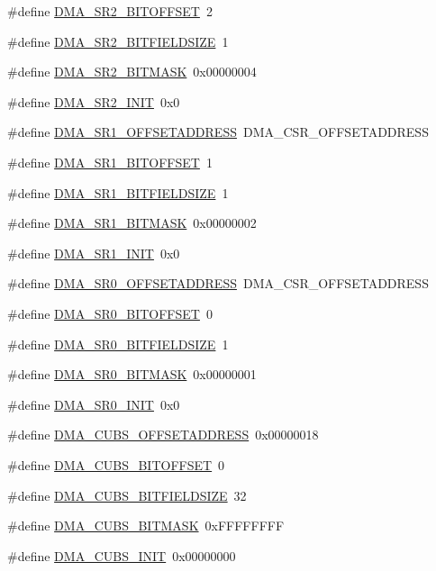 \begin{DoxyCompactItemize}
\#define \hyperlink{a00547_a04709a58304f2d8e896081ed6cf6815c}{DMA\_\-SR2\_\-BITOFFSET}~2
\item 
\#define \hyperlink{a00547_ad366e18f388c97c7fa1c05106ed5b94f}{DMA\_\-SR2\_\-BITFIELDSIZE}~1
\item 
\#define \hyperlink{a00547_aaf7ab40ea8ae2ad0865247654987b347}{DMA\_\-SR2\_\-BITMASK}~0x00000004
\item 
\#define \hyperlink{a00547_a813c497e81e26f04cb817525f4e76832}{DMA\_\-SR2\_\-INIT}~0x0
\item 
\#define \hyperlink{a00547_ada0e235423bd4db7ed48117ea4e5351a}{DMA\_\-SR1\_\-OFFSETADDRESS}~DMA\_\-CSR\_\-OFFSETADDRESS
\item 
\#define \hyperlink{a00547_a006e4b58517a5dceeb10c5c8dcb43443}{DMA\_\-SR1\_\-BITOFFSET}~1
\item 
\#define \hyperlink{a00547_aa887312016f95805db5303802fc00992}{DMA\_\-SR1\_\-BITFIELDSIZE}~1
\item 
\#define \hyperlink{a00547_a4fdaa0cb47057b0f86f4557acb74d498}{DMA\_\-SR1\_\-BITMASK}~0x00000002
\item 
\#define \hyperlink{a00547_a31b34fd5f312ae07fac98416c94975cb}{DMA\_\-SR1\_\-INIT}~0x0
\item 
\#define \hyperlink{a00547_a12acfae055f8d089c0dbe4d97c0b7204}{DMA\_\-SR0\_\-OFFSETADDRESS}~DMA\_\-CSR\_\-OFFSETADDRESS
\item 
\#define \hyperlink{a00547_acf94b64a824bad73e99bc994cc10f5b3}{DMA\_\-SR0\_\-BITOFFSET}~0
\item 
\#define \hyperlink{a00547_a2aca63d82ec9757351340b7e0e9a2f46}{DMA\_\-SR0\_\-BITFIELDSIZE}~1
\item 
\#define \hyperlink{a00547_af658b00712f16d1fa959c76271802034}{DMA\_\-SR0\_\-BITMASK}~0x00000001
\item 
\#define \hyperlink{a00547_a3926fc1ed04ea79e16d3b15b0471fdb3}{DMA\_\-SR0\_\-INIT}~0x0
\item 
\#define \hyperlink{a00547_ae42ec34ee47aeb93de341a6ef4087d21}{DMA\_\-CUBS\_\-OFFSETADDRESS}~0x00000018
\item 
\#define \hyperlink{a00547_a03295c1564a9a1804f4a2d7186a4a0f0}{DMA\_\-CUBS\_\-BITOFFSET}~0
\item 
\#define \hyperlink{a00547_aa9969448e57b7405a1c5a99f998012f9}{DMA\_\-CUBS\_\-BITFIELDSIZE}~32
\item 
\#define \hyperlink{a00547_a93acd3ca9a406ea92b1fe47474e59e3c}{DMA\_\-CUBS\_\-BITMASK}~0xFFFFFFFF
\item 
\#define \hyperlink{a00547_a949b53f83e9d5dc492fdc1b7a08c8bf9}{DMA\_\-CUBS\_\-INIT}~0x00000000

\end{DoxyCompactItemize}

